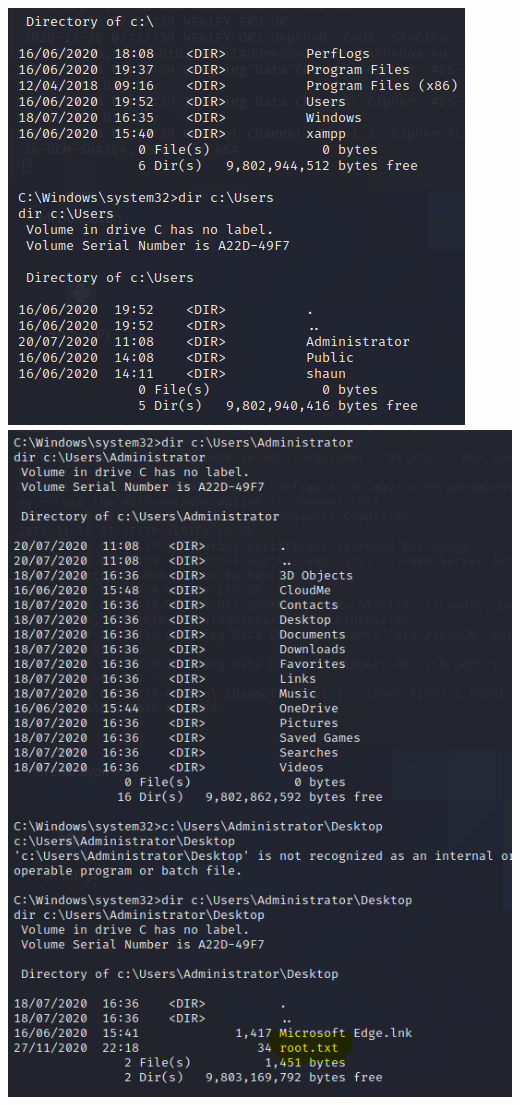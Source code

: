 \documentclass[../main.tex]{subfiles}
\begin{document}
\includegraphics[width=\linewidth]{images/Boyan/HackTheBox_24_Boyan.PNG}
\includegraphics[width=\linewidth]{images/Boyan/HackTheBox_25_Boyan.PNG}
\end{document}
